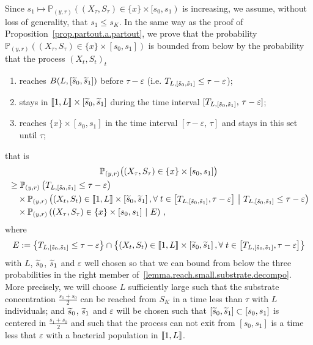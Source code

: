 \documentclass[10pt]{amsart}
\theoremstyle{definition}\newtheorem{defi}[theo]{Definition}\newtheorem{rema}[theo]{Remark}\newtheorem{exam}[theo]{Example}\newtheorem{exem}[theo]{Example}\newtheorem{nota}[theo]{Notation}
\newcommand{\llbracket}{\mathopen{[\mkern -2.7mu[}}
\newcommand{\rrbracket}{\mathclose{]\mkern -2.7mu]}}
\newcommand{\PP}{\mathbb{P}}
\newcommand{\setunL}{\llbracket 1, L\rrbracket}
\newcommand{\1}{\mathbf{1}}
\let\oldtilde\tilde
\renewcommand*{\tilde}[1]{\mathchoice{\widetilde{#1}}{\widetilde{#1}}{\oldtilde{#1}}{\oldtilde{#1}}}
\let\oldforall\forall
\renewcommand*{\forall}{\mathrel{\oldforall}}
\begin{document}
Since $s_1\mapsto \PP_{(y,r)}((X_{\tau},S_{\tau})\in \{x\}\times [s_0,s_1)$ is increasing, we assume, without loss of generality, that $s_1\leq s_K$. In the same way as the proof of Proposition~\ref{prop.partout.a.partout}, we prove that the probability $\PP_{(y,r)}((X_\tau,S_\tau)\in\{x\}\times [s_0,s_1])$ is bounded from below by the probability that the process $(X_t,S_t)_t$
\begin{enumerate}
\item reaches $B(L,[\tilde s_0,\tilde s_1])$ before $\tau-\varepsilon$ (i.e. $T_{L,[\tilde s_0,\tilde s_1]}\leq \tau-\varepsilon$);
\item stays in $\llbracket 1, L \rrbracket \times [\tilde s_0,\tilde s_1]$ during the time interval $[T_{L,[\tilde s_0,\tilde s_1]},\, \tau-\varepsilon]$;
\item reaches $\{x\}\times [s_0,s_1]$ in the time interval $[\tau-\varepsilon,\,\tau]$ and stays in this set until $\tau$;
\end{enumerate}
that is
\begin{multline}\label{lemma.reach.small.substrate.decompo}
\PP_{(y,r)}\big((X_\tau,S_\tau)\in\{x\}\times [s_0,s_1]\big)\\
\begin{aligned}
&\geq \PP_{(y,r)}\left(T_{L,\left[\tilde s_0,\tilde s_1\right]}\leq \tau-\varepsilon\right)\,
\\
&\quad\times \PP_{(y,r)}
\left((X_t,S_t)\in \llbracket 1, L \rrbracket \times \left[\tilde s_0,\tilde s_1\right],
\forall t\in \left[T_{L,\left[\tilde s_0,\tilde s_1\right]},\tau-\varepsilon\right]\ \middle| \ T_{L,[\tilde s_0,\tilde s_1]}\leq \tau-\varepsilon \right)
\\ 
&\quad\times \PP_{(y,r)}
\left((X_\tau,S_\tau)\in\{x\}\times [s_0,s_1] \ \middle| \ E \right)\,,
\end{aligned}
\end{multline}
where
\[
E:= \left\{T_{L,\left[\tilde s_0,\tilde s_1\right]}\leq \tau-\varepsilon\right\} \cap
\left\{\left(X_t,S_t\right)\in \llbracket 1, L \rrbracket \times \left[\tilde s_0,\tilde s_1\right],
\forall t\in \left[T_{L,\left[\tilde s_0,\tilde s_1\right]},\tau-\varepsilon\right]\right\}
\]
with $L$, $\tilde s_0$, $\tilde s_1$ and $\varepsilon$ well chosen so that we can bound from below the three probabilities in the right member of~\eqref{lemma.reach.small.substrate.decompo}. More precisely, we will choose $L$ sufficiently large such that the substrate concentration $\frac{s_1+s_0}{2}$ can be reached from $S_K$ in a time less than $\tau$ with $L$ individuals; and $\tilde s_0$, $\tilde s_1$ and $\varepsilon$ will be chosen such that $[\tilde s_0, \tilde s_1]\subset [s_0,s_1]$ is centered in $\frac{s_1+s_0}{2}$ and such that the process can not exit from $[s_0,s_1]$ is a time less that $\varepsilon$ with a bacterial population in $\setunL$.
\end{document}
